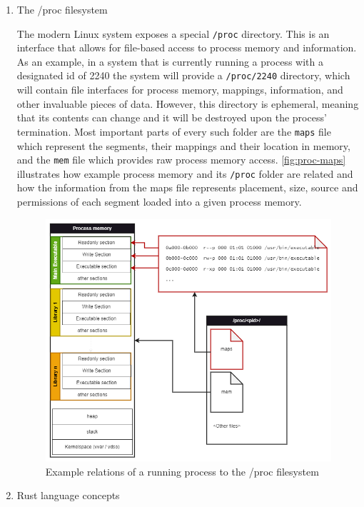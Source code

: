 \begin{enumerate}
    \item {The /proc filesystem}

    The modern Linux system exposes a special \verb|/proc| directory.
    This is an interface that allows for file-based access to process memory and information.
    As an example, in a system that is currently running a process with a designated id of 2240 the system will provide a \verb|/proc/2240| directory, which will contain file interfaces for process memory, mappings, information, and other invaluable pieces of data.
    However, this directory is ephemeral, meaning that its contents can change and it will be destroyed upon the process' termination.
    Most important parts of every such folder are the \verb|maps| file which represent the segments, their mappings and their location in memory, and the \verb|mem| file which provides raw process memory access. \autoref{fig:proc-maps} illustrates how example process memory and its \verb|/proc| folder are related and how the information from the maps file represents placement, size, source and permissions of each segment loaded into a given process memory.
    
    \begin{figure}[h]
        \centering
        \includegraphics[width=1\linewidth]{proc-maps.drawio.png}
        \caption{Example relations of a running process to the /proc filesystem}
        \label{fig:proc-maps}
    \end{figure}

    \item {Rust language concepts}


\end{enumerate}
